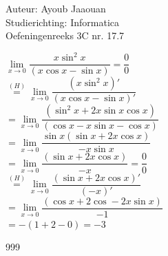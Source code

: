 \documentclass[a4paper]{article}
\begin{document}
\noindent \large Auteur: Ayoub Jaaouan \\
\noindent \large Studierichting: Informatica\\
\noindent \large Oefeningenreeks 3C nr. 17.7\\

\medskip

\normalsize

$\lim\limits_{x \rightarrow 0} \dfrac{x\sin^2 x}{(x\cos x-\sin x)} = \dfrac{0}{0} $ \\

$\overset{(H)}{=} \lim\limits_{x \rightarrow 0} \dfrac{(x\sin^2 x)'}{(x\cos x-\sin x)'}$\\

$= \lim\limits_{x \rightarrow 0} \dfrac{(\sin^2 x+2x\sin x\cos x)}{(\cos x-x\sin x-\cos x)} $\\

$= \lim\limits_{x \rightarrow 0} \dfrac{\sin x( \sin x +2x\cos x)}{-x\sin x} $\\

$= \lim\limits_{x \rightarrow 0} \dfrac{(\sin x +2x\cos x)}{-x} = \dfrac{0}{0} $\\

$\overset{(H)}{=} \lim\limits_{x \rightarrow 0} \dfrac{(\sin x +2x\cos x)'}{(-x)'} $ \\

$= \lim\limits_{x \rightarrow 0} \dfrac{(\cos x+2\cos-2x\sin x)}{-1} $\\

$ = -(1+2-0) = -3$\\





\begin{thebibliography}{999}
\end{thebibliography}
\end{document}
